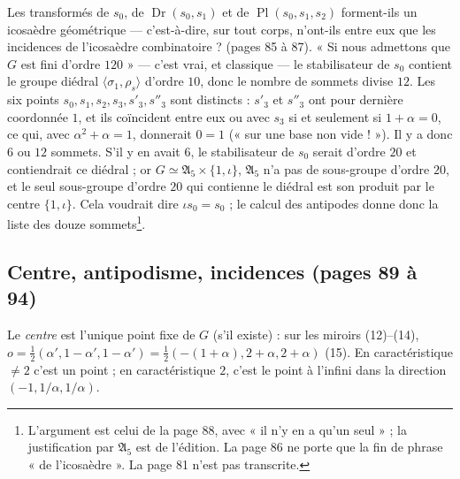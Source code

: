 \documentclass[11pt,a4paper]{article}
\begin{document}
Les transformés de $s_0$, de $\operatorname{Dr}(s_0, s_1)$ et de
$\operatorname{Pl}(s_0, s_1, s_2)$ forment-ils un icosaèdre géométrique ---
c'est-à-dire, sur tout corps, n'ont-ils entre eux que les incidences de
l'icosaèdre combinatoire ? (pages 85 à 87). « Si nous admettons que $G$ est
fini d'ordre $120$ » --- c'est vrai, et classique --- le stabilisateur de $s_0$
contient le groupe diédral $\langle \sigma_1, \rho_s \rangle$ d'ordre $10$, donc
le nombre de sommets divise $12$. Les six points $s_0, s_1, s_2, s_3, s'_3,
s''_3$ sont distincts : $s'_3$ et $s''_3$ ont pour dernière coordonnée $1$, et
ils coïncident entre eux ou avec $s_3$ si et seulement si $1 + \alpha = 0$, ce
qui, avec $\alpha^2 + \alpha = 1$, donnerait $0 = 1$ (« sur une base non vide
! »). Il y a donc $6$ ou $12$ sommets. S'il y en avait $6$, le stabilisateur de
$s_0$ serait d'ordre $20$ et contiendrait ce diédral ; or $G \simeq
\mathfrak{A}_5 \times \{1, \iota\}$, $\mathfrak{A}_5$ n'a pas de sous-groupe
d'ordre $20$, et le seul sous-groupe d'ordre $20$ qui contienne le diédral est
son produit par le centre $\{1, \iota\}$. Cela voudrait dire $\iota s_0 = s_0$
; le calcul des antipodes donne donc la liste des douze
sommets\footnote{L'argument est celui de la page 88, avec « il n'y en a qu'un
seul » ; la justification par $\mathfrak{A}_5$ est de l'édition. La page 86 ne
porte que la fin de phrase « de l'icosaèdre ». La page 81 n'est pas
transcrite.}.

\subsection*{Centre, antipodisme, incidences (pages 89 à 94)}

Le \emph{centre} est l'unique point fixe de $G$ (s'il existe) : sur les miroirs
(12)--(14), $o = \tfrac12(\alpha', 1 - \alpha', 1 - \alpha') = \tfrac12(-(1 +
\alpha), 2 + \alpha, 2 + \alpha)$ (15). En caractéristique $\neq 2$ c'est un
point ; en caractéristique $2$, c'est le point à l'infini dans la direction
$(-1, 1/\alpha, 1/\alpha)$.
\end{document}
